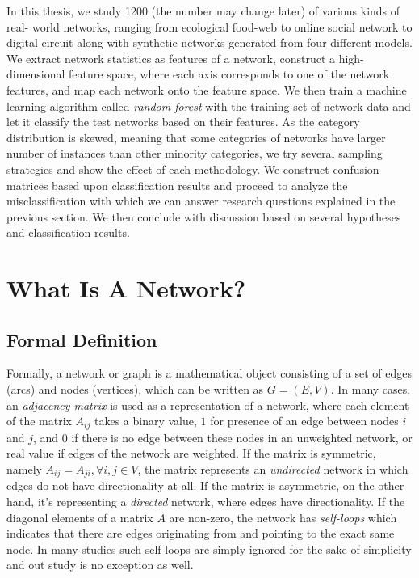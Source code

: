\documentclass{article}
\begin{document}
In this thesis, we study 1200 (the number may change later) of various kinds of real- world networks, ranging from ecological food-web to online social network to digital circuit along with synthetic networks generated from four different models. We extract network statistics as features of a network, construct a high-dimensional feature space, where each axis corresponds to one of the network features, and map each network onto the feature space. We then train a machine learning algorithm called \textit{random forest} with the training set of network data and let it classify the test networks based on their features. As the category distribution is skewed, meaning that some categories of networks have larger number of instances than other minority categories, we try several sampling strategies and show the effect of each methodology. We construct confusion matrices based upon classification results and proceed to analyze the misclassification with which we can answer research questions explained in the previous section. We then conclude with discussion based on several hypotheses and classification results.



\section{What Is A Network?}
	\subsection{Formal Definition}
	Formally, a network or graph is a mathematical object consisting of a set of edges (arcs) and nodes (vertices), which can be written as $G = (E,V)$. In many cases, an \textit{adjacency matrix} is used as a representation of a network, where each element of the matrix $A_{ij}$ takes a binary value, $1$ for presence of an edge between nodes $i$ and $j$, and $0$ if there is no edge between these nodes in an unweighted network, or real value if edges of the network are weighted. If the matrix is symmetric, namely $A_{ij} = A_{ji},  \forall i,j \in V$, the matrix represents an \textit{undirected} network in which edges do not have directionality at all. If the matrix is asymmetric, on the other hand, it's representing a \textit{directed} network, where edges have directionality. If the diagonal elements of a matrix $A$ are non-zero, the network has \textit{self-loops} which indicates that there are edges originating from and pointing to the exact same node. In many studies such self-loops are simply ignored for the sake of simplicity and out study is no exception as well.
	
\end{document}
